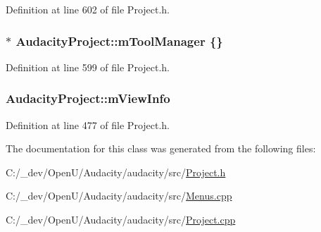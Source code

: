 Definition at line 602 of file Project.\+h.

\subsubsection[{\texorpdfstring{m\+Tool\+Manager}{mToolManager}}]{$\ast$ Audacity\+Project\+::m\+Tool\+Manager \{\}}\hypertarget{class_audacity_project_a4d5de5c65abaf8dbe01f96a0749c507b}{}\label{class_audacity_project_a4d5de5c65abaf8dbe01f96a0749c507b}


Definition at line 599 of file Project.\+h.

\subsubsection[{\texorpdfstring{m\+View\+Info}{mViewInfo}}]{ Audacity\+Project\+::m\+View\+Info}\hypertarget{class_audacity_project_aefe314298c89d89d301515e586d3c2fc}{}\label{class_audacity_project_aefe314298c89d89d301515e586d3c2fc}


Definition at line 477 of file Project.\+h.



The documentation for this class was generated from the following files\+:\begin{DoxyCompactItemize}
\item 
C\+:/\+\_\+dev/\+Open\+U/\+Audacity/audacity/src/\hyperlink{_project_8h}{Project.\+h}\item 
C\+:/\+\_\+dev/\+Open\+U/\+Audacity/audacity/src/\hyperlink{_menus_8cpp}{Menus.\+cpp}\item 
C\+:/\+\_\+dev/\+Open\+U/\+Audacity/audacity/src/\hyperlink{_project_8cpp}{Project.\+cpp}\end{DoxyCompactItemize}
